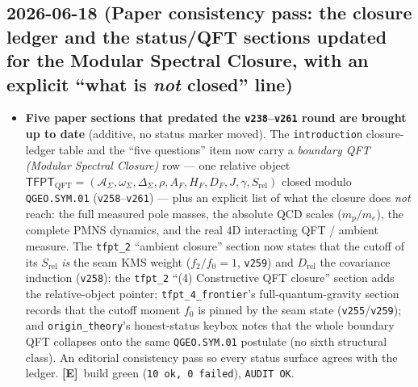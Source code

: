 \documentclass[11pt]{article}
\providecommand{\mE}{\textbf{[E]}}\providecommand{\mC}{\textbf{[C]}}
\providecommand{\vref}[1]{\texttt{#1}}
\begin{document}
\subsection*{2026-06-18 (Paper consistency pass: the closure ledger and the status/QFT sections updated for the Modular Spectral Closure, with an explicit ``what is \emph{not} closed'' line)}
\begin{itemize}
\item \textbf{Five paper sections that predated the \texttt{v238}--\texttt{v261} round are brought up to date}
  (additive, no status marker moved). The \texttt{introduction} closure-ledger table and the
  ``five questions'' item now carry a \emph{boundary QFT (Modular Spectral Closure)} row --- one relative
  object $\mathsf{TFPT}_{\mathrm{QFT}}=(\mathcal A_\Sigma,\omega_\Sigma,\Delta_\Sigma,\rho,A_F,H_F,D_F,J,
  \gamma,S_{\mathrm{rel}})$ closed modulo \texttt{QGEO.SYM.01} (\vref{v258}--\vref{v261}) --- plus an explicit
  list of what the closure does \emph{not} reach: the full measured pole masses, the absolute QCD scales
  ($m_p/m_e$), the complete PMNS dynamics, and the real $4$D interacting QFT / ambient measure. The
  \texttt{tfpt\_2} ``ambient closure'' section now states that the cutoff of its $S_{\mathrm{rel}}$ \emph{is}
  the seam KMS weight ($f_2/f_0{=}1$, \vref{v259}) and $D_{\mathrm{rel}}$ the covariance induction
  (\vref{v258}); the \texttt{tfpt\_2} ``(4) Constructive QFT closure'' section adds the relative-object
  pointer; \texttt{tfpt\_4\_frontier}'s full-quantum-gravity section records that the cutoff moment $f_0$ is
  pinned by the seam state (\vref{v255}/\vref{v259}); and \texttt{origin\_theory}'s honest-status keybox notes
  that the whole boundary QFT collapses onto the same \texttt{QGEO.SYM.01} postulate (no sixth structural
  class). An editorial consistency pass so every status surface agrees with the ledger. \mE\ build green
  (\texttt{10 ok, 0 failed}), \texttt{AUDIT OK}.
\end{itemize}
\end{document}
